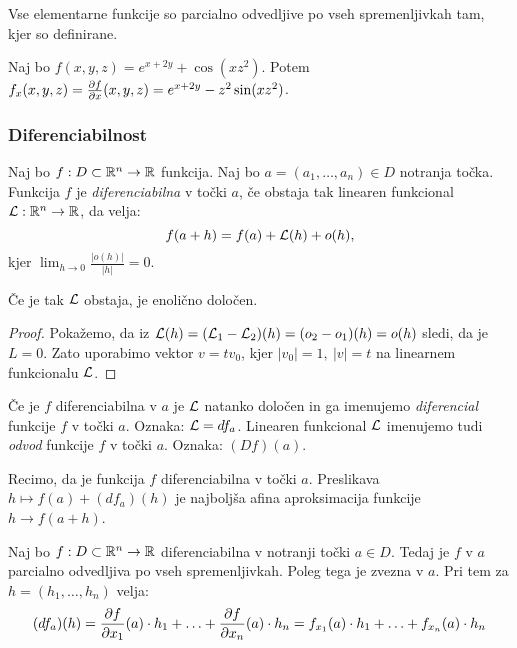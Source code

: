 \begin{opomba}
    Vse elementarne funkcije so parcialno odvedljive po vseh spremenljivkah tam, kjer so definirane.
\end{opomba}

\begin{zgled}
    Naj bo $f(x, y, z) = e^{x+2y} + \cos(xz^2)$. Potem $f_x(x, y, z) = \frac{\partial f}{\partial x}(x, y, z) = e^{x+2y} - z^2 \sin(xz^2)$.
\end{zgled}

\subsubsection{Diferenciabilnost}
\begin{definicija}
    Naj bo $f: D \subset \mathbb{R}^n \to \mathbb{R}$ funkcija. Naj bo $a = (a_1, \ldots, a_n) \in D$ notranja točka. Funkcija $f$ je \emph{diferenciabilna} v točki $a$, če obstaja tak linearen funkcional $\mathcal{L}: \mathbb{R}^n \to \mathbb{R}$, da velja:
    $$f(a+h) = f(a) + \mathcal{L}(h) + o(h),$$
    kjer $\lim_{h \to 0} \frac{|o(h)|}{|h|} = 0$.
\end{definicija}

\begin{opomba}
    Če je tak $\mathcal{L}$ obstaja, je enolično določen.
\end{opomba}

\begin{proof}
    Pokažemo, da iz $\mathcal{L}(h) = (\mathcal{L}_1 - \mathcal{L}_2)(h) = (o_2 - o_1)(h) = o(h)$ sledi, da je $L = 0$. Zato uporabimo vektor $v = tv_0$, kjer $|v_0| = 1, \ |v| = t$ na linearnem funkcionalu $\mathcal{L}$.
\end{proof}

\begin{definicija}
    Če je $f$ diferenciabilna v $a$ je $\mathcal{L}$ natanko določen in ga imenujemo \emph{diferencial} funkcije $f$ v točki $a$. Oznaka: $\mathcal{L} = df_a$. Linearen funkcional $\mathcal{L}$ imenujemo tudi \emph{odvod} funkcije $f$ v točki $a$. Oznaka: $(Df)(a)$.
\end{definicija}

\begin{opomba}
    Recimo, da je funkcija $f$ diferenciabilna v točki $a$. Preslikava $h \mapsto f(a) + (df_a)(h)$ je najboljša afina aproksimacija funkcije $h \to f(a+h)$.
\end{opomba}

\begin{trditev}
    Naj bo $f: D \subset \mathbb{R}^n \to \mathbb{R}$ diferenciabilna v notranji točki $a \in D$. Tedaj je $f$ v $a$ parcialno odvedljiva po vseh spremenljivkah. Poleg tega je zvezna v $a$. Pri tem za $h = (h_1, \ldots, h_n)$ velja:
    $$(df_a)(h) = \frac{\partial f}{\partial x_1}(a) \cdot h_1 + \ldots + \frac{\partial f}{\partial x_n}(a) \cdot h_n = f_{x_1}(a) \cdot h_1 + \ldots + f_{x_n}(a) \cdot h_n$$
\end{trditev}

